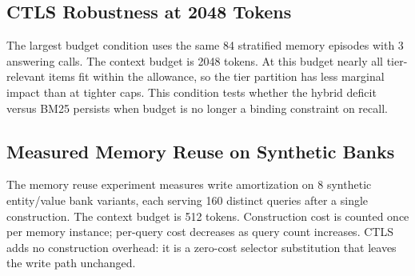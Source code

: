 \subsection{CTLS Robustness at 2048 Tokens}

\label{sec:setup_protocol_replication}

The largest budget condition uses the same 84 stratified memory episodes with 3 answering calls. The context budget is 2048 tokens. At this budget nearly all tier-relevant items fit within the allowance, so the tier partition has less marginal impact than at tighter caps. This condition tests whether the hybrid deficit versus BM25 persists when budget is no longer a binding constraint on recall.

\subsection{Measured Memory Reuse on Synthetic Banks}

\label{sec:setup_memory_reuse}

The memory reuse experiment measures write amortization on 8 synthetic entity/value bank variants, each serving 160 distinct queries after a single construction. The context budget is 512 tokens. Construction cost is counted once per memory instance; per-query cost decreases as query count increases. CTLS adds no construction overhead: it is a zero-cost selector substitution that leaves the write path unchanged.
